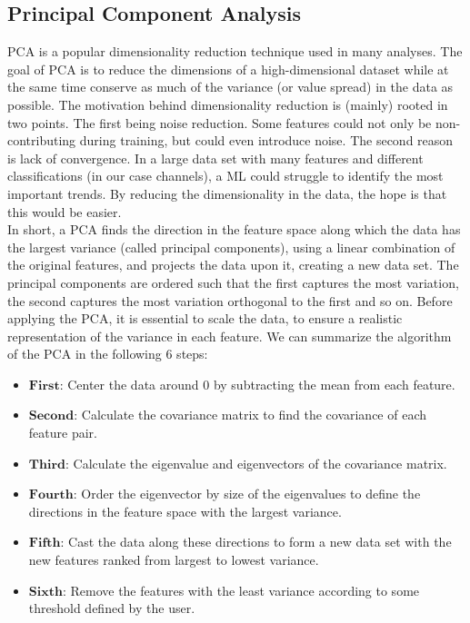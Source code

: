 \subsection{Principal Component Analysis}\label{subsec:PCA}
\ac{PCA} is a popular dimensionality reduction technique used in many analyses. The goal of
\ac{PCA} is to reduce the dimensions of a high-dimensional dataset while at the same time conserve as 
much of the variance (or value spread) in the data as possible. The motivation behind dimensionality reduction 
is (mainly) rooted in two points. The first being noise reduction. Some features could not only be non-contributing 
during training, but could even introduce noise. The second reason is lack of convergence. In a large 
data set with many features and different classifications (in our case channels), a \ac{ML} could struggle
to identify the most important trends. By reducing the dimensionality in the data, the hope is that this 
would be easier. 
\\
In short, a \ac{PCA} finds the direction in the feature space along which the data has the largest 
variance (called principal components), using a linear combination of the original features, and projects the
data upon it, creating a new data set. The principal components are ordered such that the first captures the most variation,
the second captures the most variation orthogonal to the first and so on. Before applying the \ac{PCA}, it is essential to 
scale the data, to ensure a realistic representation of the variance in each feature.  We can summarize the algorithm of the 
\ac{PCA} in the following 6 steps:
\begin{itemize}
    \item $\textbf{First}$: Center the data around 0 by subtracting the mean from each feature.
    \item $\textbf{Second}$: Calculate the covariance matrix to find the covariance 
                             of each feature pair.
    \item $\textbf{Third}$: Calculate the eigenvalue and eigenvectors of the covariance matrix.
    \item $\textbf{Fourth}$: Order the eigenvector by size of the eigenvalues to define the directions 
                             in the feature space with the largest variance.
    \item $\textbf{Fifth}$: Cast the data along these directions to form a new data set with 
                             the new features ranked from largest to lowest variance.
    \item $\textbf{Sixth}$: Remove the features with the least variance according to some threshold
                            defined by the user.                      
\end{itemize}
